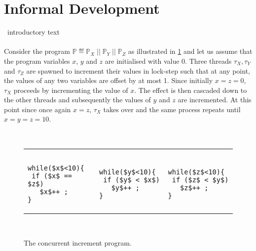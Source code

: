 \section{Informal Development}\label{sec:intuition}
\todo\ introductory text\\\\
Consider the program $\mathbb{P} \eqdef \mathbb{P}_X \;\!\!||\;\! \mathbb{P}_Y \;\!\!||\;\! \mathbb{P}_Z$ as illustrated in \fig\ref{fig:concurrentInc} and let us assume that the program variables $x$, $y$ and $z$ are initialised with value $0$. Three threads $\tau_X, \tau_Y$ and $\tau_Z$ are spawned to increment their values in lock-step such that at any point, the values of any two variables are offset by at most 1. Since initially $x=z=0$, $\tau_X$ proceeds by incrementing the value of $x$. The effect is then cascaded down to the other threads and subsequently the values of $y$ and $z$ are incremented. At this point since once again $x = z$, $\tau_X$ takes over and the same process repeats until $x = y = z = 10$. 
%
%
\begin{figure}
\noindent\makebox[\linewidth]{\rule{\linewidth}{1pt}} \vspace*{-5pt}\\
\hspace*{-0.2cm}
\begin{tabular}{l || l || l}
	\color{blue}{$\mathbb{P}_X$ :}& 
	\color{blue}{$\mathbb{P}_Y$ :}& 
	\color{blue}{$\mathbb{P}_Z$ :} \\
	 &&\vspace*{-5pt}\\
\begin{lstlisting}[mathescape]
while($x$<10){
 if ($x$ == $z$) 
   $x$++ ;
}
\end{lstlisting}
&
\begin{lstlisting}[mathescape]
while($y$<10){
 if ($y$ < $x$) 
   $y$++ ;
}
\end{lstlisting}
&
\begin{lstlisting}[mathescape]
while($z$<10){
 if ($z$ < $y$) 
   $z$++ ;
}
\end{lstlisting}

\end{tabular} \vspace*{5pt}\\
\noindent\makebox[\linewidth]{\rule{\linewidth}{1pt}} \vspace*{-12pt}
\caption{The concurrent increment program.}
\label{fig:concurrentInc}
\end{figure}
%
%
%
%
